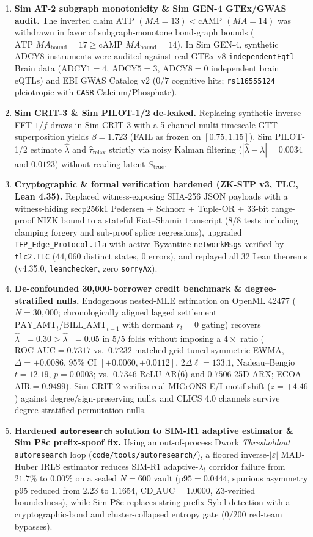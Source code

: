 \documentclass[11pt]{article}
\begin{document}
\begin{enumerate}
\item \textbf{Sim AT-2 subgraph monotonicity \& Sim GEN-4 GTEx/GWAS audit.} The inverted claim $\text{ATP } (MA=13) < \text{cAMP } (MA=14)$ was withdrawn in favor of subgraph-monotone bond-graph bounds ($\text{ATP } MA_{\text{bound}} = 17 \ge \text{cAMP } MA_{\text{bound}} = 14$). In Sim GEN-4, synthetic ADCY8 instruments were audited against real GTEx v8 \texttt{independentEqtl} Brain data ($\text{ADCY1}=4$, $\text{ADCY5}=3$, $\text{ADCY8}=0$ independent brain eQTLs) and EBI GWAS Catalog v2 ($0/7$ cognitive hits; \texttt{rs116555124} pleiotropic with \texttt{CASR} Calcium/Phosphate).
\item \textbf{Sim CRIT-3 \& Sim PILOT-1/2 de-leaked.} Replacing synthetic inverse-FFT $1/f$ draws in Sim CRIT-3 with a 5-channel multi-timescale GTT superposition yields $\beta = 1.723$ (FAIL as frozen on $[0.75, 1.15]$). Sim PILOT-1/2 estimate $\hat{\lambda}$ and $\hat{\tau}_{\mathrm{relax}}$ strictly via noisy Kalman filtering ($|\hat{\lambda}-\lambda| = 0.0034$ and $0.0123$) without reading latent $S_{\text{true}}$.
\item \textbf{Cryptographic \& formal verification hardened (ZK-STP v3, TLC, Lean 4.35).} Replaced witness-exposing SHA-256 JSON payloads with a witness-hiding secp256k1 Pedersen + Schnorr + Tuple-OR + 33-bit range-proof NIZK bound to a stateful Fiat--Shamir transcript ($8/8$ tests including clamping forgery and sub-proof splice regressions), upgraded \texttt{TFP\_Edge\_Protocol.tla} with active Byzantine \texttt{networkMsgs} verified by \texttt{tlc2.TLC} ($44{,}060$ distinct states, $0$ errors), and replayed all $32$ Lean theorems (v4.35.0, \texttt{leanchecker}, zero \texttt{sorryAx}).
\item \textbf{De-confounded 30,000-borrower credit benchmark \& degree-stratified nulls.} Endogenous nested-MLE estimation on OpenML 42477 ($N = 30{,}000$; chronologically aligned lagged settlement $\mathrm{PAY\_AMT}_t/\mathrm{BILL\_AMT}_{t-1}$ with dormant $r_t=0$ gating) recovers $\hat{\lambda}^- = 0.30 > \hat{\lambda}^+ = 0.05$ in $5/5$ folds without imposing a $4\times$ ratio ($\text{ROC-AUC} = 0.7317$ vs.\ $0.7232$ matched-grid tuned symmetric EWMA, $\Delta = +0.0086$, $95\%$ CI $[+0.0060, +0.0112]$, $2\Delta\ell = 133.1$, Nadeau--Bengio $t = 12.19$, $p = 0.0003$; vs.\ $0.7346$ ReLU AR(6) and $0.7506$ 25D ARX; ECOA $\text{AIR} = 0.9499$). Sim CRIT-2 verifies real MICrONS E/I motif shift ($z = +4.46$) against degree/sign-preserving nulls, and CLICS 4.0 channels survive degree-stratified permutation nulls.
\item \textbf{Hardened \texttt{autoresearch} solution to SIM-R1 adaptive estimator \& Sim P8c prefix-spoof fix.} Using an out-of-process Dwork \emph{Thresholdout} \texttt{autoresearch} loop (\texttt{code/tools/autoresearch/}), a floored inverse-$|\varepsilon|$ MAD-Huber IRLS estimator reduces SIM-R1 adaptive-$\lambda_t$ corridor failure from $21.7\%$ to $0.00\%$ on a sealed $N = 600$ vault ($\text{p95} = 0.0444$, spurious asymmetry p95 reduced from $2.23$ to $1.1654$, $\text{CD\_AUC} = 1.0000$, Z3-verified boundedness), while Sim P8c replaces string-prefix Sybil detection with a cryptographic-bond and cluster-collapsed entropy gate ($0/200$ red-team bypasses).

\end{enumerate}
\end{document}
